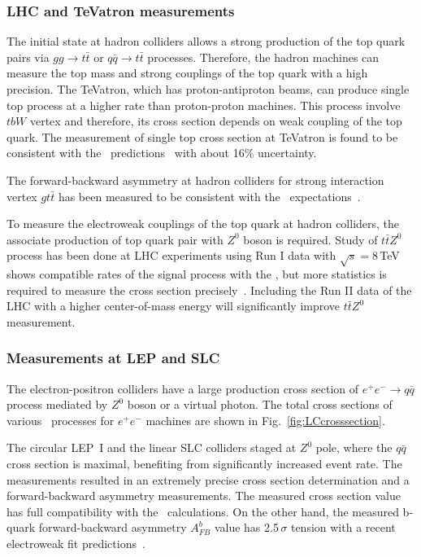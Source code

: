 \subsubsection{LHC and TeVatron measurements}
The initial state at hadron colliders allows a strong production of the top quark pairs via $gg\to t\bar{t}$ or $q\bar{q}\to t\bar{t}$ processes. 
Therefore, the hadron machines can measure the top mass and strong couplings of the top quark with a high precision. 
The TeVatron, which has proton-antiproton beams, can produce single top process at a higher rate than proton-proton machines. 
This process involve $tbW$ vertex and therefore, its cross section depends on weak coupling of the top quark. 
The measurement of single top cross section at TeVatron is found to be consistent with the \sm\ predictions~\cite{bib:TeVstop} with about 16\% uncertainty.

The forward-backward asymmetry at hadron colliders for strong interaction vertex $gt\bar{t}$ has been measured to be consistent with the \sm\ expectations~\cite{bib:TeVAfb}. 

To measure the electroweak couplings of the top quark at hadron colliders, the associate production of top quark pair with $Z^0$ boson is required. 
Study of $t\bar{t}Z^0$ process has been done at LHC experiments using Run I data with $\sqrt{s} = 8$\,TeV shows compatible rates of the signal process with the \sm, but more statistics is required to measure the cross section precisely~\cite{bib:CMSttz2014}. 
Including the Run II data of the LHC with a higher center-of-mass energy will significantly improve $t\bar{t}Z^0$ measurement.


\subsubsection{Measurements at LEP and SLC}
The electron-positron colliders have a large production cross section of $e^+e^- \to q\bar{q}$ process mediated by $Z^0$ boson or a virtual photon. The total cross sections of various \sm\ processes for $e^+e^-$ machines are shown in Fig.~\ref{fig:LCcrosssection}.

The circular LEP~I and the linear SLC colliders staged at $Z^0$ pole, where the $q\bar{q}$ cross section is maximal, benefiting from significantly increased event rate. 
The measurements resulted in an extremely precise cross section determination and a forward-backward asymmetry measurements. 
The measured cross section value has full compatibility with the \sm\ calculations. 
On the other hand, the measured b-quark forward-backward asymmetry $A_{FB}^b$ value has  2.5\,$\sigma$ tension with a recent electroweak fit predictions~\cite{bib:AfbSMFit}.

